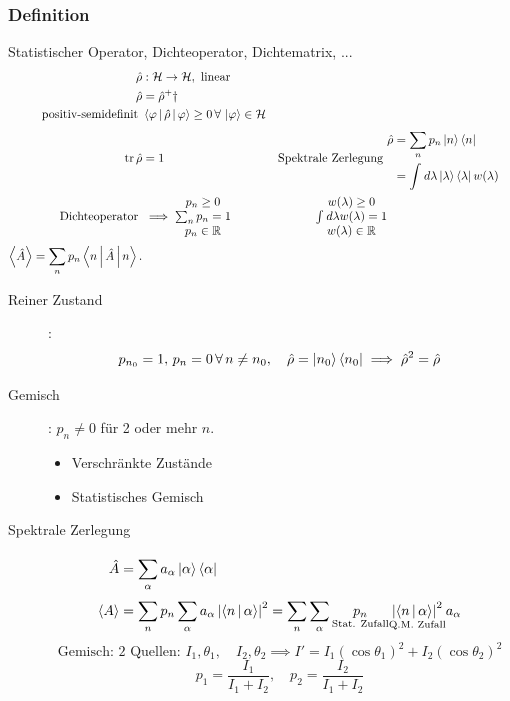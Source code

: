 \documentclass[11pt]{article}
\theoremstyle{plain}
\theoremstyle{mytheoremstyle}
\newcommand{\R}{\mathbb{R}}
\newcommand{\abs}[1]{\left| #1 \right|}
\newcommand{\trace}{\operatorname{tr}}
\begin{document}
\subsubsection*{Definition}
Statistischer Operator, Dichteoperator, Dichtematrix, ...
\begin{align*}
  \hat{\rho} & : \mathcal{H} \to  \mathcal{H}, \text{ linear } \\
  \hat{\rho} & = \hat{\rho}^+\dagger \\
  \text{positiv-semidefinit } & \Braket{\varphi | \hat{\rho}| \varphi} \ge 0 \,\forall\,\Ket{\varphi} \in \mathcal{ H} \\
  \trace \hat{\rho } & =1  &
  \text{Spektrale Zerlegung } & \begin{split}
  \hat{\rho} &=  \sum_{n}^{} p_n \Ket{n}\Bra{n} \\ &= \int_{}^{} d \lambda \Ket{\lambda}\Bra{\lambda} w(\lambda) 
  \end{split}
   \\
  \text{Dichteoperator } & \implies \begin{matrix} p_n \ge 0 \\ \sum_{n}^{} p_n =1 \\
p_n \in \R \end{matrix} 
&
\begin{matrix} 
  w(\lambda )\ge 0 \\ \int_{}^{} d \lambda w( \lambda )=1 \\ w(\lambda) \in \R 
\end{matrix} \\
  \Braket{\hat{A}}= \sum_{n}^{}p_n \Braket{n|\hat{A}|n}.
\end{align*}
\begin{description}
  \item[Reiner Zustand]: \[ p_{n_0}=1,\, p_n =0 \,\forall\, n \neq n_0, \quad  \hat{\rho}= \Ket{n_0}\Bra{n_0} \implies \hat{\rho}^2=\hat{\rho} \]  
  \item[Gemisch]: $p_n \neq 0 $ f\"ur 2 oder mehr $n$.
    \begin{itemize}
      \item Verschr\"ankte Zust\"ande
      \item Statistisches Gemisch
    \end{itemize}
  \item[Spektrale Zerlegung] \begin{align*}
    \hat{A} &= \sum_{\alpha}^{}a_ \alpha \Ket{\alpha}\Bra{\alpha} \\
    \Braket{A}&= \sum_{n}^{}p_n \sum_{\alpha}^{}a_ \alpha \abs{\Braket{n|\alpha}}^2
    = \sum_{n}^{}\sum_{\alpha}^{} \underset{\text{Stat. Zufall}}{p_n} \underset{\text{Q.M. Zufall}}{\abs{\Braket{n|\alpha}}^2} a_ \alpha
  \end{align*}
  \[ \text{Gemisch: 2 Quellen: } I_1, \theta_1, \quad I_2, \theta_2 \implies 
  I'= I_1 ( \cos{\theta_1})^2 + I_2 (\cos{\theta_2})^2 \] 
  \[ p_1 = \frac{I_1}{I_1 + I_2}, \quad p_2 = \frac{I_2}{I_1 + I_2} \] 
\end{description}
\end{document}
